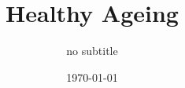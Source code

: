 \documentclass{master_thesis.style}		%
\begin{document}
\frontmatter

\title{Healthy Ageing}
\addresses{\groupname\\\deptname\\\univname}
\date{\today}
\subject{Healthy Ageing}
\subtitle {no subtitle}
% 

\maketitle



\tableofcontents


%




%





%
%

\backmatter
\typeout{}




\end{document}
